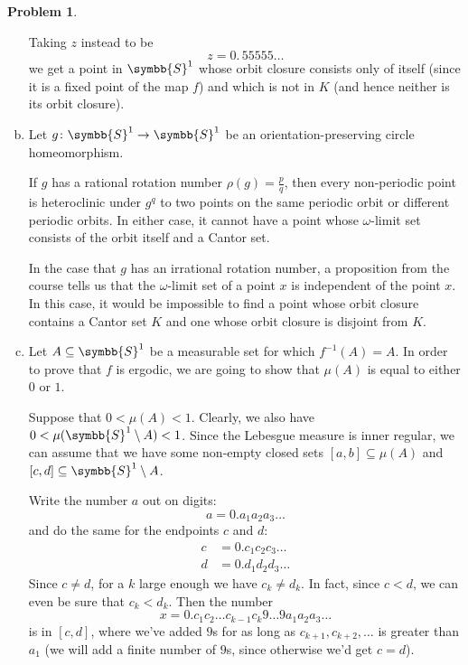 \documentclass[a4paper, 12pt]{article}
\theoremstyle{definition}
\newtheorem{problem}{Problem}
\begin{document}
\begin{problem}
\begin{enumerate}[a)]
    Taking \(z\) instead to be
    \[
        z = 0. \, 5 5 5 5 5 \dots
    \]
    we get a point in \(\symbb{S}^1\) whose orbit closure consists only of itself (since it is a fixed point of the map \(f\)) and which is not in \(K\) (and hence neither is its orbit closure).

    \item Let \(g \colon \symbb{S}^1 \to \symbb{S}^1\) be an orientation-preserving circle homeomorphism.

    If \(g\) has a rational rotation number \(\rho(g) = \frac{p}{q}\), then every non-periodic point is heteroclinic under \(g^q\) to two points on the same periodic orbit or different periodic orbits. In either case, it cannot have a point whose \(\omega\)-limit set consists of the orbit itself and a Cantor set.

    In the case that \(g\) has an irrational rotation number, a proposition from the course tells us that the \(\omega\)-limit set of a point \(x\) is independent of the point \(x\). In this case, it would be impossible to find a point whose orbit closure contains a Cantor set \(K\) and one whose orbit closure is disjoint from \(K\).

    \item Let \(A \subseteq \symbb{S}^1\) be a measurable set for which \(f^{-1} (A) = A\). In order to prove that \(f\) is ergodic, we are going to show that \(\mu(A)\) is equal to either \(0\) or \(1\).
    
    Suppose that \(0 < \mu(A) < 1\). Clearly, we also have \(0 < \mu(\symbb{S}^1 \setminus A) < 1\). Since the Lebesgue measure is inner regular, we can assume that we have some non-empty closed sets \([a, b] \subseteq \mu(A)\) and \([c, d] \subseteq \symbb{S}^1 \setminus A\).

    Write the number \(a\) out on digits:
    \[
        a = 0. a_1 a_2 a_3 \dots
    \]
    and do the same for the endpoints \(c\) and \(d\):
    \begin{align*}
        c &= 0. c_1 c_2 c_3 \dots \\
        d &= 0. d_1 d_2 d_3 \dots
    \end{align*}
    Since \(c \neq d\), for a \(k\) large enough we have \(c_k \neq d_k\). In fact, since \(c < d\), we can even be sure that \(c_k < d_k\). Then the number
    \[
        x = 0. c_1 c_2 \dots c_{k - 1} c_k 9 \dots 9 a_1 a_2 a_3 \dots
    \]
    is in \([c, d]\), where we've added \(9\)s for as long as \(c_{k + 1}, c_{k + 2}, \dots\) is greater than \(a_1\) (we will add a finite number of \(9\)s, since otherwise we'd get \(c = d\)).


\end{enumerate}
\end{problem}
\end{document}
